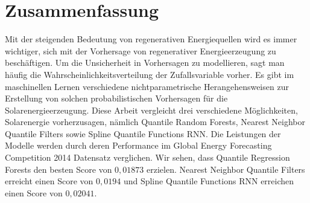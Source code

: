 
\chapter*{Zusammenfassung}

\begin{center}
  \begin{minipage}{12cm}
    \begin{sloppypar}
      Mit der steigenden Bedeutung von regenerativen Energiequellen wird es immer wichtiger, 
      sich mit der Vorhersage von regenerativer Energieerzeugung zu beschäftigen. 
      Um die Unsicherheit in Vorhersagen zu modellieren, sagt man häufig die Wahrscheinlichkeitsverteilung der 
      Zufallsvariable vorher. Es gibt im maschinellen Lernen verschiedene nichtparametrische Herangehensweisen 
      zur Erstellung von solchen probabilistischen Vorhersagen für die Solarenergieerzeugung. 
      Diese Arbeit vergleicht drei verschiedene Möglichkeiten, Solarenergie 
      vorherzusagen, nämlich Quantile Random Forests, Nearest Neighbor Quantile Filters sowie Spline Quantile Functions RNN. 
      Die Leistungen der Modelle werden durch deren Performance im Global Energy Forecasting Competition 2014 Datensatz verglichen. 
      Wir sehen, dass Quantile Regression Forests den besten Score von \(0{,}01873\) erzielen. Nearest Neighbor Quantile Filters 
      erreicht einen Score von \(0{,}0194\) und Spline Quantile Functions RNN erreichen einen Score von \(0{,}02041\).
    \end{sloppypar}
  \end{minipage}
\end{center}